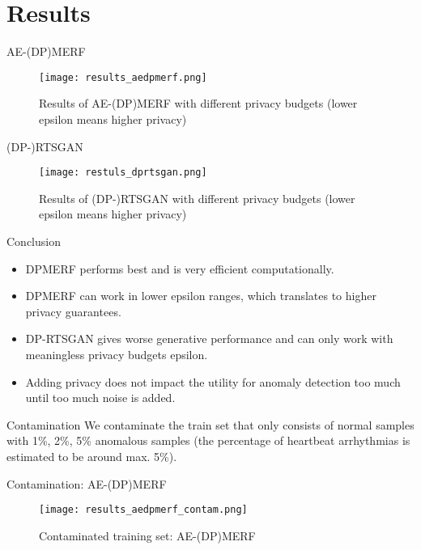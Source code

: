 \section{Results}

\begin{frame}{AE-(DP)MERF}
    \begin{figure}
        \centering
        \texttt{[image: results\_aedpmerf.png]}
        \caption{Results of AE-(DP)MERF with different privacy budgets (lower epsilon means higher privacy)}
        \label{fig:enter-label}
    \end{figure}
\end{frame}

\begin{frame}{(DP-)RTSGAN}
    \begin{figure}
        \centering
        \texttt{[image: restuls\_dprtsgan.png]}
        \caption{Results of (DP-)RTSGAN with different privacy budgets (lower epsilon means higher privacy)}
        \label{fig:enter-label}
    \end{figure}
\end{frame}

\begin{frame}{Conclusion}
    \begin{itemize}
        \item DPMERF performs best and is very efficient computationally.
        \item DPMERF can work in lower epsilon ranges, which translates to higher privacy guarantees.
        \item DP-RTSGAN gives worse generative performance and can only work with meaningless privacy budgets epsilon.
        \item Adding privacy does not impact the utility for anomaly detection too much until too much noise is added.
    \end{itemize}
\end{frame}

\begin{frame}{Contamination}
    We contaminate the train set that only consists of normal samples with 1\%, 2\%, 5\% anomalous samples (the percentage of heartbeat arrhythmias is estimated to be around max. 5\%).
\end{frame}

\begin{frame}{Contamination: AE-(DP)MERF}
    \begin{figure}
        \centering
        \texttt{[image: results\_aedpmerf\_contam.png]}
        \caption{Contaminated training set: AE-(DP)MERF}
        \label{fig:enter-label}
    \end{figure}
\end{frame}

